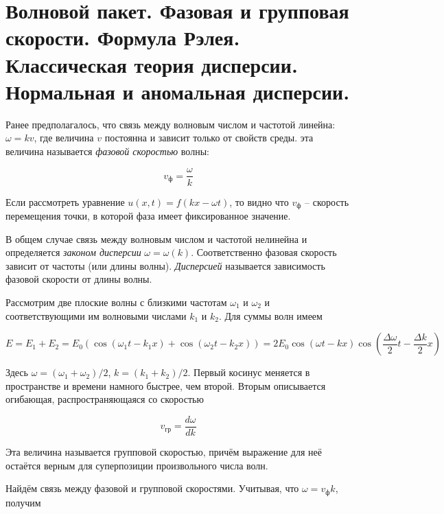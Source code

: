 \section{Волновой пакет. Фазовая и групповая скорости. Формула Рэлея. Классическая теория дисперсии.
Нормальная и аномальная дисперсии.}

Ранее предполагалось, что связь между волновым числом и частотой линейна: $\omega = k v$, где величина $v$ постоянна и зависит только от свойств среды. эта величина называется \textit{фазовой скоростью} волны:

\begin{equation}
    v_\text{ф} = \frac{\omega}{k}
\end{equation}

\noindent
Если рассмотреть уравнение $u(x, t) = f(k x - \omega t)$, то видно что $v_\text{ф}$ -- скорость перемещения точки, в которой фаза имеет фиксированное значение.

В общем случае связь между волновым числом и частотой нелинейна и определяется \textit{законом дисперсии} $\omega = \omega(k)$. Соответственно фазовая скорость зависит от частоты (или длины волны). \textit{Дисперсией} называется зависимость фазовой скорости от длины волны.

Рассмотрим две плоские волны с близкими частотам $\omega_1$ и $\omega_2$ и соответствующими им волновыми числами $k_1$ и $k_2$. Для суммы волн имеем

\begin{equation}
    E = E_1 + E_2 = E_0 \left( \cos \left( \omega_1 t - k_1 x \right) + \cos \left( \omega_2 t - k_2 x \right) \right) = 2 E_0 \cos \left( \omega t - k x \right) \cos \left( \frac{\Delta \omega}{2} t - \frac{\Delta k}{2} x \right)
\end{equation}

\noindent
Здесь $\omega = (\omega_1 + \omega_2) / 2$, $k = (k_1 + k_2) / 2$. Первый косинус меняется в пространстве и времени намного быстрее, чем второй. Вторым описывается огибающая, распространяющаяся со скоростью

\begin{equation}
    v_\text{гр} = \frac{d \omega}{d k}
\end{equation}

\noindent
Эта величина называется групповой скоростью, причём выражение для неё остаётся верным для суперпозиции произвольного числа волн.

Найдём связь между фазовой и групповой скоростями. Учитывая, что $\omega = v_\text{ф} k$, получим

